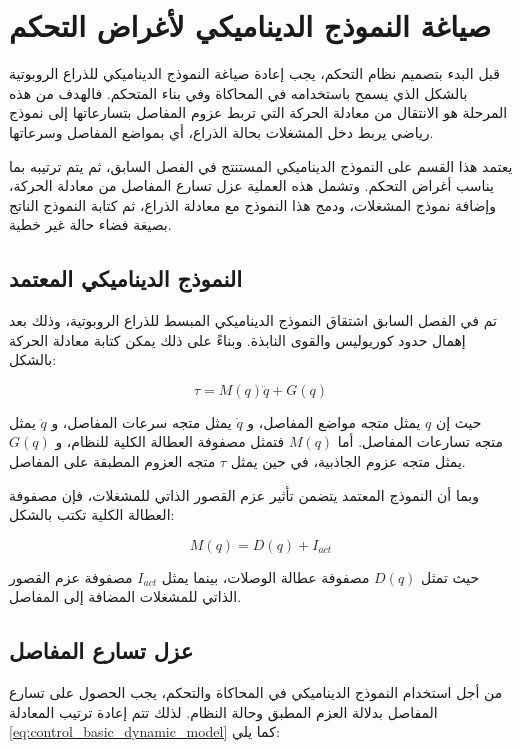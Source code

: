 \section{صياغة النموذج الديناميكي لأغراض التحكم}

قبل البدء بتصميم نظام التحكم، يجب إعادة صياغة النموذج الديناميكي للذراع الروبوتية بالشكل الذي يسمح باستخدامه في المحاكاة وفي بناء المتحكم. فالهدف من هذه المرحلة هو الانتقال من معادلة الحركة التي تربط عزوم المفاصل بتسارعاتها إلى نموذج رياضي يربط دخل المشغلات بحالة الذراع، أي بمواضع المفاصل وسرعاتها.

يعتمد هذا القسم على النموذج الديناميكي المستنتج في الفصل السابق، ثم يتم ترتيبه بما يناسب أغراض التحكم. وتشمل هذه العملية عزل تسارع المفاصل من معادلة الحركة، وإضافة نموذج المشغلات، ودمج هذا النموذج مع معادلة الذراع، ثم كتابة النموذج الناتج بصيغة فضاء حالة غير خطية.

\subsection{النموذج الديناميكي المعتمد}

تم في الفصل السابق اشتقاق النموذج الديناميكي المبسط للذراع الروبوتية، وذلك بعد إهمال حدود كوريوليس والقوى النابذة. وبناءً على ذلك يمكن كتابة معادلة الحركة بالشكل:

\begin{equation}
\tau = M(q)\ddot{q} + G(q)
\label{eq:control_basic_dynamic_model}
\end{equation}

حيث إن \(q\) يمثل متجه مواضع المفاصل، و \(\dot{q}\) يمثل متجه سرعات المفاصل، و \(\ddot{q}\) يمثل متجه تسارعات المفاصل. أما \(M(q)\) فتمثل مصفوفة العطالة الكلية للنظام، و \(G(q)\) يمثل متجه عزوم الجاذبية، في حين يمثل \(\tau\) متجه العزوم المطبقة على المفاصل.

وبما أن النموذج المعتمد يتضمن تأثير عزم القصور الذاتي للمشغلات، فإن مصفوفة العطالة الكلية تكتب بالشكل:

\begin{equation}
M(q)=D(q)+I_{act}
\label{eq:control_total_inertia}
\end{equation}

حيث تمثل \(D(q)\) مصفوفة عطالة الوصلات، بينما يمثل \(I_{act}\) مصفوفة عزم القصور الذاتي للمشغلات المضافة إلى المفاصل.

\subsection{عزل تسارع المفاصل}

من أجل استخدام النموذج الديناميكي في المحاكاة والتحكم، يجب الحصول على تسارع المفاصل بدلالة العزم المطبق وحالة النظام. لذلك تتم إعادة ترتيب المعادلة \eqref{eq:control_basic_dynamic_model} كما يلي:


